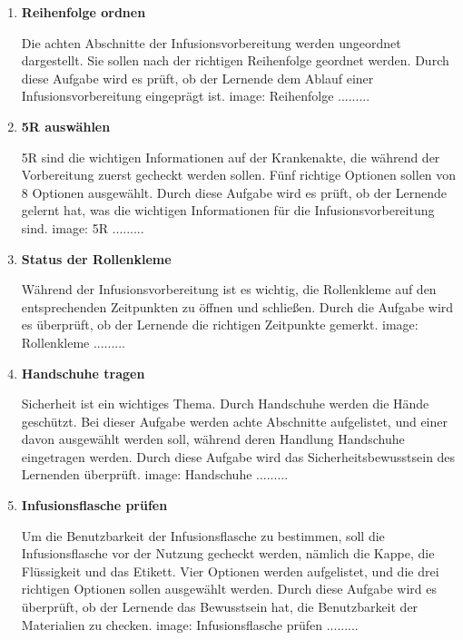 \begin{enumerate}
    \item \textbf{Reihenfolge ordnen}
    
    Die achten Abschnitte der Infusionsvorbereitung werden ungeordnet dargestellt. Sie sollen nach der richtigen Reihenfolge geordnet werden. Durch diese Aufgabe wird es prüft, ob der Lernende dem Ablauf einer Infusionsvorbereitung eingeprägt ist.
    image: Reihenfolge .........
    
    \item \textbf{5R auswählen}
    
    5R sind die wichtigen Informationen auf der Krankenakte, die während der Vorbereitung zuerst gecheckt werden sollen. Fünf richtige Optionen sollen von 8 Optionen ausgewählt. Durch diese Aufgabe wird es prüft, ob der Lernende gelernt hat, was die wichtigen Informationen für die Infusionsvorbereitung sind.
    image: 5R .........
    
    \item \textbf{Status der Rollenkleme}
    
    Während der Infusionsvorbereitung ist es wichtig, die Rollenkleme auf den entsprechenden Zeitpunkten zu öffnen und schließen. Durch die Aufgabe wird es überprüft, ob der Lernende die richtigen Zeitpunkte gemerkt.
    image: Rollenkleme .........
    
    \item \textbf{Handschuhe tragen}
    
    Sicherheit ist ein wichtiges Thema. Durch Handschuhe werden die Hände geschützt. Bei dieser Aufgabe werden achte Abschnitte aufgelistet, und einer davon ausgewählt werden soll, während deren Handlung Handschuhe eingetragen werden. Durch diese Aufgabe wird das Sicherheitsbewusstsein des Lernenden überprüft.
    image: Handschuhe .........
    
    \item \textbf{Infusionsflasche prüfen}
    
    Um die Benutzbarkeit der Infusionsflasche zu bestimmen, soll die Infusionsflasche vor der Nutzung gecheckt werden, nämlich die Kappe, die Flüssigkeit und das Etikett. Vier Optionen werden aufgelistet, und die drei richtigen Optionen sollen ausgewählt werden. Durch diese Aufgabe wird es überprüft, ob der Lernende das Bewusstsein hat, die Benutzbarkeit der Materialien zu checken.
    image: Infusionsflasche prüfen .........
    
\end{enumerate}

